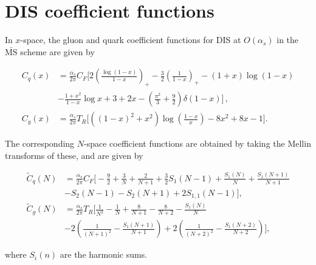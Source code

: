 \documentclass[11pt,a4paper]{article}
\begin{document}



\clearpage

\section{DIS coefficient functions}

In $x$-space, the gluon and quark coefficient functions for DIS at $O(\alpha_s)$ in the $\bar{\text{MS}}$ scheme are given by \cite{Ellis:318585}

\begin{equation}
    \begin{aligned}
        C_q(x) &= \frac{\alpha_s}{2\pi}C_F \Bigg[ 2\left( \frac{\log(1-x)}{1-x} \right)_+ - \frac{3}{2}\left( \frac{1}{1-x} \right)_+ - (1 + x) \log(1-x) \\[4mm]
        &- \frac{1+x^2}{1-x}\log x + 3 + 2x - \left( \frac{\pi^2}{3} + \frac{9}{2} \right) \delta(1-x) \Bigg] \, , \\[4mm]
        C_g(x) &= \frac{\alpha_s}{2\pi}T_R \Bigg[ \left( (1-x)^2 + x^2 \right)\log(\frac{1 - x}{x}) - 8x^2 + 8x - 1 \Bigg] .
    \end{aligned}
\end{equation}

\noindent The corresponding $N$-space coefficient functions are obtained by taking the Mellin transforms of these, and are given by

\begin{equation}
    \begin{aligned}
        \tilde{C}_q(N) &= \frac{\alpha_s}{2\pi}C_F \Bigg[ -\frac{9}{2}+\frac{3}{N} + \frac{2}{N+1} + \frac{3}{2}S_1(N-1) + \frac{S_1(N)}{N} + \frac{S_1(N+1)}{N+1} \\[4mm]
        &- S_2(N-1) - S_2(N+1) + 2 S_{1,1}(N-1)\Bigg], \\[4mm]
        \tilde{C}_g(N) &= \frac{\alpha_s}{2\pi}T_R \Bigg[ \frac{1}{N^2} - \frac{1}{N} + \frac{8}{N+1} - \frac{8}{N+2} - \frac{S_1(N)}{N} \\[4mm]
        &- 2 \left( \frac{1}{(N+1)^2} - \frac{S_1(N+1)}{N+1} \right) + 2 \left( \frac{1}{(N+2)^2} - \frac{S_1(N+2)}{N+2} \right)\Bigg],
    \end{aligned}
\end{equation}

\noindent where $S_i(n)$ are the harmonic sums.





\end{document}
